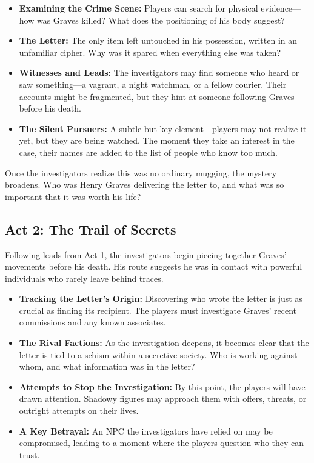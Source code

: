 \begin{WyrdExplanation}
    \begin{itemize}
        \item \textbf{Examining the Crime Scene:} Players can search for physical evidence—how was Graves killed? What does the positioning of his body suggest?
        \item \textbf{The Letter:} The only item left untouched in his possession, written in an unfamiliar cipher. Why was it spared when everything else was taken?
        \item \textbf{Witnesses and Leads:} The investigators may find someone who heard or saw something—a vagrant, a night watchman, or a fellow courier. Their accounts might be fragmented, but they hint at someone following Graves before his death.
        \item \textbf{The Silent Pursuers:} A subtle but key element—players may not realize it yet, but they are being watched. The moment they take an interest in the case, their names are added to the list of people who know too much.
    \end{itemize}
\end{WyrdExplanation}

\noindent
Once the investigators realize this was no ordinary mugging, the mystery broadens. Who was Henry Graves delivering the letter to, and what was so important that it was worth his life?

\subsection{Act 2: The Trail of Secrets}  
Following leads from Act 1, the investigators begin piecing together Graves' movements before his death. His route suggests he was in contact with powerful individuals who rarely leave behind traces.  

\begin{WyrdExplanation}
    \begin{itemize}
        \item \textbf{Tracking the Letter’s Origin:} Discovering who wrote the letter is just as crucial as finding its recipient. The players must investigate Graves' recent commissions and any known associates.
        \item \textbf{The Rival Factions:} As the investigation deepens, it becomes clear that the letter is tied to a schism within a secretive society. Who is working against whom, and what information was in the letter?
        \item \textbf{Attempts to Stop the Investigation:} By this point, the players will have drawn attention. Shadowy figures may approach them with offers, threats, or outright attempts on their lives.
        \item \textbf{A Key Betrayal:} An NPC the investigators have relied on may be compromised, leading to a moment where the players question who they can trust.
    \end{itemize}
\end{WyrdExplanation}

